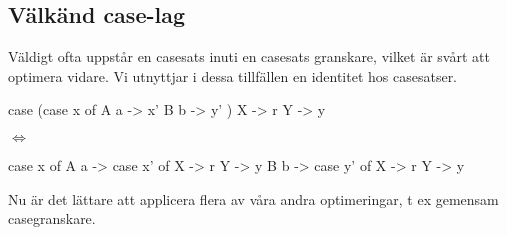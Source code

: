 \documentclass[../Optimise]{subfiles}
\begin{document}
\subsection{Välkänd case-lag}

Väldigt ofta uppstår en casesats inuti en casesats granskare, 
vilket är svårt att optimera vidare.
Vi utnyttjar i dessa tillfällen en identitet hos casesatser. 
\begin{codeEx}
 case (case x of
         A a -> x'
         B b -> y'
      )
   X -> r
   Y -> y

\end{codeEx}
 
$\Leftrightarrow$

\begin{codeEx}
 case x of
     A a -> case x' of
              X -> r
              Y -> y
     B b -> case y' of
              X -> r
              Y -> y
\end{codeEx}

Nu är det lättare att applicera flera av våra andra optimeringar, 
t ex gemensam casegranskare. 
\end{document}
